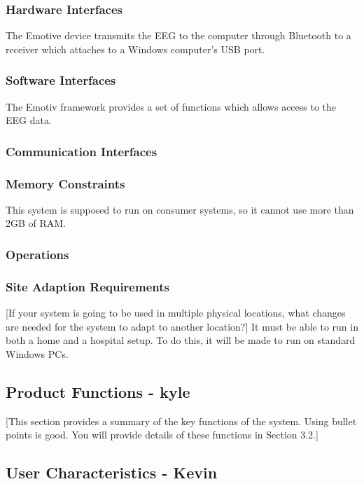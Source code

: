\documentclass{report}
\begin{document}
\subsubsection{Hardware Interfaces}

The Emotive device transmits the EEG to the computer through Bluetooth to a receiver which attaches to a Windows computer's USB port.

\subsubsection{Software Interfaces}

The Emotiv framework provides a set of functions which allows access 	to the EEG data.

\subsubsection{Communication Interfaces}

\subsubsection{Memory Constraints}

This system is supposed to run on consumer systems, so it cannot use more than 2GB of RAM.

\subsubsection{Operations}

\subsubsection{Site Adaption Requirements}

[If your system is going to be used in multiple physical locations, what changes are needed for the system to adapt to another location?]
It must be able to run in both a home and a hospital setup. To do this, it will be made to run on standard Windows PCs.

\subsection{Product Functions - kyle}
[This section provides a summary of the key functions of the system. Using bullet points is good. You will provide details of these functions in Section 3.2.]

\subsection{User Characteristics - Kevin}
\end{document}
